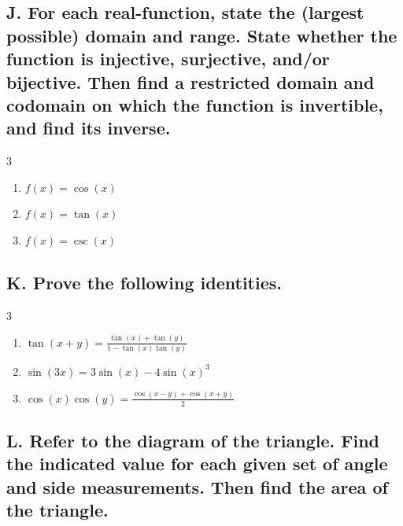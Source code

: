 \documentclass{article}
\begin{document}
\subsection*{J. For each real-function, state the (largest possible) domain and range. State whether the function is injective, surjective, and/or bijective. Then find a restricted domain and codomain on which the function is invertible, and find its inverse.}
\begin{multicols}{3}
\begin{enumerate}
    \item $f(x)=\cos(x)$
    \item $f(x)=\tan(x)$
    \item $f(x)=\csc(x)$
\end{enumerate}
\end{multicols}

\subsection*{K. Prove the following identities.}
\begin{multicols}{3}
\begin{enumerate}
    \item $\tan(x+y)=\frac{\tan(x)+\tan(y)}{1-\tan(x)\tan(y)}$
    \item $\sin(3x)=3\sin(x)-4\sin(x)^3$
    \item $\cos(x)\cos(y)=\frac{\cos(x-y)+\cos(x+y)}{2}$
\end{enumerate}
\end{multicols}

\subsection*{L. Refer to the diagram of the triangle. Find the indicated value for each given set of angle and side measurements. Then find the area of the triangle.}
\end{document}
